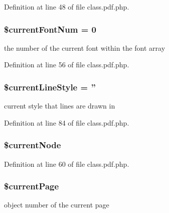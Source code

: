 \-Definition at line 48 of file class.\-pdf.\-php.

\hypertarget{class_cpdf_a40d5e19fffea92115faffb8a58d5c6d6}{
\subsubsection[{\$current\-Font\-Num}]{\setlength{\rightskip}{0pt plus 5cm}\$current\-Font\-Num = 0}}\label{class_cpdf_a40d5e19fffea92115faffb8a58d5c6d6}
the number of the current font within the font array 

\-Definition at line 56 of file class.\-pdf.\-php.

\hypertarget{class_cpdf_a6e74a726b7c21bfd7d927955ae767188}{
\subsubsection[{\$current\-Line\-Style}]{\setlength{\rightskip}{0pt plus 5cm}\$current\-Line\-Style = ''}}\label{class_cpdf_a6e74a726b7c21bfd7d927955ae767188}
current style that lines are drawn in 

\-Definition at line 84 of file class.\-pdf.\-php.

\hypertarget{class_cpdf_a640e9f9a022022672baf0926e7b079ef}{
\subsubsection[{\$current\-Node}]{\setlength{\rightskip}{0pt plus 5cm}\$current\-Node}}\label{class_cpdf_a640e9f9a022022672baf0926e7b079ef}


\-Definition at line 60 of file class.\-pdf.\-php.

\hypertarget{class_cpdf_af64cef3e8e7fe1dc79ff3293c12fb4cb}{
\subsubsection[{\$current\-Page}]{\setlength{\rightskip}{0pt plus 5cm}\$current\-Page}}\label{class_cpdf_af64cef3e8e7fe1dc79ff3293c12fb4cb}
object number of the current page 

